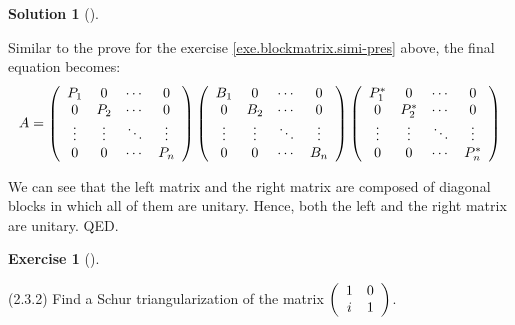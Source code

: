 \documentclass[numbers=enddot,12pt,final,onecolumn,notitlepage]{scrartcl}
\newcounter{exer}
\newcounter{sol}
\theoremstyle{definition}
\newtheorem{exmp}[exer]{Exercise}
\newenvironment{exercise}[1][]
{\begin{exmp}[#1]\begin{leftbar}}
        {\end{leftbar}\end{exmp}}
\newtheorem{solu}[sol]{Solution}
\newenvironment{solution}[1][]
{\begin{solu}[#1]\begin{leftbar}}
        {\end{leftbar}\end{solu}}
\begin{document}
\begin{solution}
	Similar to the prove for the exercise \ref{exe.blockmatrix.simi-pres} above, the final equation becomes:
	\[
		A	=
		\left(\begin{array}
				[c]{cccc}%
				P_1    & 0      & \cdots & 0      \\
				0      & P_2    & \cdots & 0      \\
				\vdots & \vdots & \ddots & \vdots \\
				0      & 0      & \cdots & P_n    %
			\end{array}\right)
		\left(\begin{array}
				[c]{cccc}%
				B_1    & 0      & \cdots & 0      \\
				0      & B_2    & \cdots & 0      \\
				\vdots & \vdots & \ddots & \vdots \\
				0      & 0      & \cdots & B_n    %
			\end{array}\right)
		\left(\begin{array}
				[c]{cccc}%
				P_1^{\ast} & 0          & \cdots & 0          \\
				0          & P_2^{\ast} & \cdots & 0          \\
				\vdots     & \vdots     & \ddots & \vdots     \\
				0          & 0          & \cdots & P_n^{\ast} %
			\end{array}\right)
	\]

	We can see that the left matrix and the right matrix are composed of diagonal blocks in which all of them are unitary. Hence, both the left and the right matrix are unitary. QED.

\end{solution}

\begin{exercise}
	\label{exe.schurtri.schurtri.one2x2} (2.3.2) Find a Schur triangularization of
	the matrix $\left(
		\begin{array}
				[c]{cc}%
				1 & 0 \\
				i & 1
			\end{array}
		\right)  $.
\end{exercise}
\end{document}
